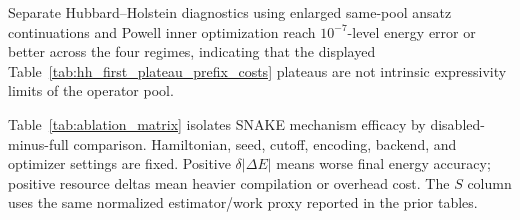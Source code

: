 \documentclass[
  reprint,
  amsmath,
  amssymb,
  aps,
  pra,
  nofootinbib,
  superscriptaddress,
  floatfix
]{revtex4-2}
\begin{document}
\begin{widetext}
Separate Hubbard--Holstein diagnostics using enlarged same-pool ansatz continuations and Powell inner optimization reach \(10^{-7}\)-level energy error or better across the four regimes, indicating that the displayed Table~\ref{tab:hh_first_plateau_prefix_costs} plateaus are not intrinsic expressivity limits of the operator pool.
\par\addvspace{1.0ex}

Table~\ref{tab:ablation_matrix} isolates SNAKE mechanism efficacy by disabled-minus-full comparison. Hamiltonian, seed, cutoff, encoding, backend, and optimizer settings are fixed. Positive $\delta|\Delta E|$ means worse final energy accuracy; positive resource deltas mean heavier compilation or overhead cost. The $S$ column uses the same normalized estimator/work proxy reported in the prior tables.


\end{widetext}
\end{document}
